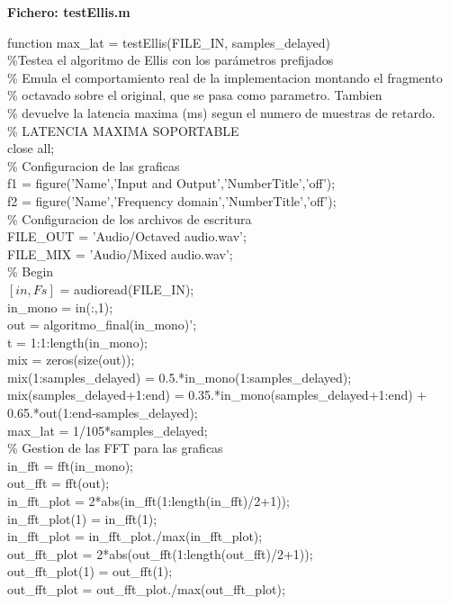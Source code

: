 \noindent \textbf{Fichero: testEllis.m}

\noindent function max\_lat = testEllis(FILE\_IN, samples\_delayed)\\
\%Testea el algoritmo de Ellis con los parámetros prefijados\\
\%   Emula el comportamiento real de la implementacion montando el fragmento\\
\%   octavado sobre el original, que se pasa como parametro. Tambien\\
\%   devuelve la latencia maxima (ms) segun el numero de muestras de retardo.\\

\noindent \% LATENCIA MAXIMA SOPORTABLE\\
close all;\\
\% Configuracion de las graficas\\
f1 = figure('Name','Input and Output','NumberTitle','off');\\
f2 = figure('Name','Frequency domain','NumberTitle','off');\\
\% Configuracion de los archivos de escritura\\
FILE\_OUT = 'Audio/Octaved audio.wav';\\
FILE\_MIX = 'Audio/Mixed audio.wav';\\

\noindent \% Begin\\
$[in, Fs]$ = audioread(FILE\_IN);\\
 in\_mono = in(:,1);\\
out = algoritmo\_final(in\_mono)';\\
t = 1:1:length(in\_mono);\\

\noindent mix = zeros(size(out));\\
mix(1:samples\_delayed) = 0.5.*in\_mono(1:samples\_delayed);\\
mix(samples\_delayed+1:end) = 0.35.*in\_mono(samples\_delayed+1:end) + 0.65.*out(1:end-samples\_delayed);\\
max\_lat = 1/105*samples\_delayed;\\

\noindent \% Gestion de las FFT para las graficas\\
in\_fft = fft(in\_mono);\\
out\_fft = fft(out);\\
in\_fft\_plot = 2*abs(in\_fft(1:length(in\_fft)/2+1));\\
in\_fft\_plot(1) = in\_fft(1);\\
in\_fft\_plot = in\_fft\_plot./max(in\_fft\_plot);\\
out\_fft\_plot = 2*abs(out\_fft(1:length(out\_fft)/2+1));\\
out\_fft\_plot(1) = out\_fft(1);\\
out\_fft\_plot = out\_fft\_plot./max(out\_fft\_plot);\\

